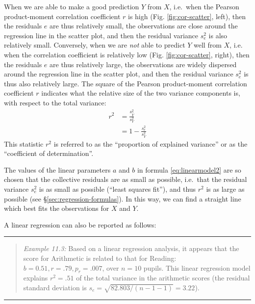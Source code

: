 \documentclass[
]{book}
\begin{document}
When we are able to make a good prediction \(Y\) from \(X\), i.e.~when the Pearson
product-moment correlation coefficient \(r\) is high
(Fig. \ref{fig:cor-scatter}, left), then the residuals \(e\) are thus relatively
small, the observations are close around the regression line in the scatter
plot, and then the residual variance \(s^2_e\) is also relatively small.
Conversely, when we are \emph{not} able to predict \(Y\) well from \(X\), i.e.
when the correlation coefficient is relatively low (Fig. \ref{fig:cor-scatter}, right),
then the residuals \(e\) are thus relatively large, the observations are widely dispersed
around the regression line in the scatter plot, and then the residual variance \(s^2_e\) is thus
also relatively large. The square of the Pearson
product-moment correlation coefficient \(r\) indicates what the relative size of the
two variance components is, with respect to the total
variance:
\begin{align}
    r^2 & = \frac{s^2_{\widehat{Y}}}{s^2_Y} \\
        & = 1 - \frac{s^2_e}{s^2_Y}
  \label{eq:r2}
\end{align}
This statistic \(r^2\) is referred to as the ``proportion of explained
variance'' or as the ``coefficient of determination''.

The values of the linear parameters \(a\) and \(b\) in
formula \eqref{eq:linearmodel2} are so chosen that the collective
residuals are as small as possible, i.e.~that the residual variance
\(s^2_e\) is as small as possible (``least squares fit''), and thus \(r^2\)
is as large as possible (see
§\ref{sec:regression-formulas}). In this way, we can find a straight line
which best fits the observations for \(X\) and \(Y\).

A linear regression can also be reported as follows:

\begin{center}\rule{0.5\linewidth}{0.5pt}\end{center}

\begin{quote}
\emph{Example 11.3:}
Based on a linear regression analysis, it appears that the score
for Arithmetic is related to that for Reading: \(b=0.51, r=.79, p_r=.007\), over \(n=10\)
pupils. This linear regression model explains \(r^2=.51\) of the
total variance in the arithmetic scores (the residual standard deviation is
\(s_e= \sqrt{82.803/(n-1-1)} = 3.22\)).
\end{quote}

\begin{center}\rule{0.5\linewidth}{0.5pt}\end{center}
\end{document}
